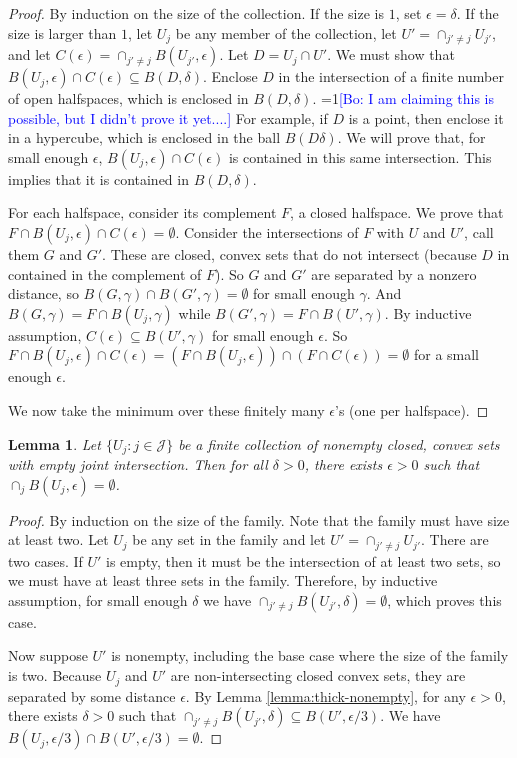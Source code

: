 \documentclass{article}
\newcommand{\Comments}{1}
\newcommand{\mynote}[2]{\ifnum\Comments=1\textcolor{#1}{#2}\fi}
\newcommand{\bo}[1]{\mynote{blue}{[Bo: #1]}}
\newtheorem{lemma}{Lemma}
\begin{document}
\begin{proof}
  By induction on the size of the collection.
  If the size is $1$, set $\epsilon = \delta$.
  If the size is larger than $1$, let $U_j$ be any member of the collection, let $U' = \cap_{j'\neq j} U_{j'}$, and let $C(\epsilon) = \cap_{j'\neq j} B(U_{j'},\epsilon)$.
  Let $D = U_j \cap U'$.
  We must show that $B(U_j,\epsilon) \cap C(\epsilon) \subseteq B(D,\delta)$.
  Enclose $D$ in the intersection of a finite number of open halfspaces, which is enclosed in $B(D,\delta)$. \bo{I am claiming this is possible, but I didn't prove it yet....}
  For example, if $D$ is a point, then enclose it in a hypercube, which is enclosed in the ball $B(D\delta)$.
  We will prove that, for small enough $\epsilon$, $B(U_j,\epsilon) \cap C(\epsilon)$ is contained in this same intersection.
  This implies that it is contained in $B(D,\delta)$.

  For each halfspace, consider its complement $F$, a closed halfspace.
  We prove that $F \cap B(U_j,\epsilon) \cap C(\epsilon) = \emptyset$.
  Consider the intersections of $F$ with $U$ and $U'$, call them $G$ and $G'$.
  These are closed, convex sets that do not intersect (because $D$ in contained in the complement of $F$).
  So $G$ and $G'$ are separated by a nonzero distance, so $B(G,\gamma) \cap B(G',\gamma) = \emptyset$ for small enough $\gamma$.
  And $B(G,\gamma) = F \cap B(U_j,\gamma)$ while $B(G',\gamma) = F \cap B(U',\gamma)$.
  By inductive assumption, $C(\epsilon) \subseteq B(U',\gamma)$ for small enough $\epsilon$.
  So $F \cap B(U_j,\epsilon) \cap C(\epsilon) = \left(F \cap B(U_j,\epsilon)\right) \cap \left(F \cap C(\epsilon)\right) = \emptyset$ for a small enough $\epsilon$.

  We now take the minimum over these finitely many $\epsilon$'s (one per halfspace).
\end{proof}

\begin{lemma} \label{lemma:thick-empty}
  Let $\{U_j : j \in \mathcal{J}\}$ be a finite collection of nonempty closed, convex sets with empty joint intersection.
  Then for all $\delta > 0$, there exists  $\epsilon > 0$ such that $\cap_j B(U_j,\epsilon) = \emptyset$.
\end{lemma}
\begin{proof}
  By induction on the size of the family.
  Note that the family must have size at least two.
  Let $U_j$ be any set in the family and let $U' = \cap_{j' \neq j} U_{j'}$.
  There are two cases.
  If $U'$ is empty, then it must be the intersection of at least two sets, so we must have at least three sets in the family.
  Therefore, by inductive assumption, for small enough $\delta$ we have $\cap_{j' \neq j} B(U_{j'},\delta) = \emptyset$, which proves this case.

  Now suppose $U'$ is nonempty, including the base case where the size of the family is two.
  Because $U_j$ and $U'$ are non-intersecting closed convex sets, they are separated by some distance $\epsilon$.
  By Lemma \ref{lemma:thick-nonempty}, for any $\epsilon > 0$, there exists $\delta > 0$ such that $\cap_{j'\neq j} B(U_{j'},\delta) \subseteq B(U', \epsilon/3)$.
  We have $B(U_j, \epsilon/3) \cap B(U', \epsilon/3) = \emptyset$.
\end{proof}
\end{document}
